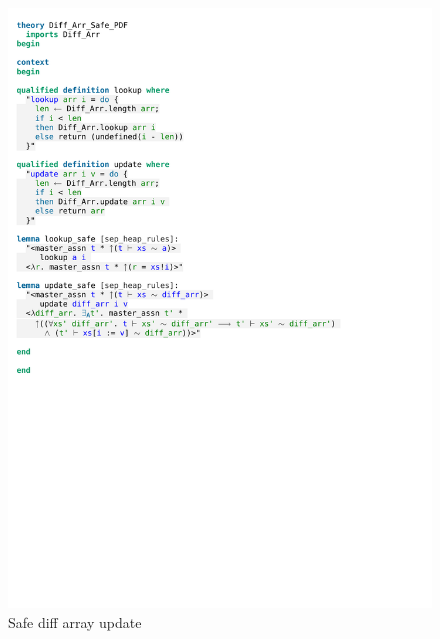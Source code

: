 \begin{figure}[htpb]
    \includegraphics[trim={0 19cm 0 7,6cm}, clip, width=1.00\textwidth]{figures/Theory_Diff_Arr_Safe.pdf}
    \caption[Safe diff array update]{Safe diff array update}
    \label{fig:diff_arr_update_safe}
\end{figure}

